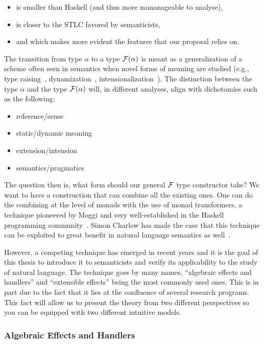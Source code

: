 \begin{itemize}
\item is smaller than Haskell (and thus more mananageable to analyse),
\item is closer to the STLC favored by semanticists,
\item and which makes more evident the features that our proposal relies on.
\end{itemize}

The transition from type $\alpha$ to a type $\mathcal{F}(\alpha)$ is meant as a
generalization of a scheme often seen in semantics when novel forms of
meaning are studied (e.g., type raising~\cite{montague1973proper},
dynamization~\cite{lebedeva2012expression},
intensionalization~\cite{de2013note}). The distinction between the type
$\alpha$ and the type $\mathcal{F}(\alpha)$ will, in different analyses, align with
dichotomies such as the following:

\begin{itemize}
\item reference/sense
\item static/dynamic meaning
\item extension/intension
\item semantics/pragmatics
\end{itemize}

The question then is, what form should our general $\mathcal{F}$ type constructor
take? We want to have a construction that can combine all the existing
ones. One can do the combining at the level of monads with the use of monad
transformers, a technique pioneered by Moggi and very well-established in
the Haskell programming community~\cite{moggi1991notions}. Simon Charlow
has made the case that this technique can be exploited to great benefit in
natural language semantics as well~\cite{charlow2014semantics}.

However, a competing technique has emerged in recent years and it is the
goal of this thesis to introduce it to semanticists and verify its
applicability to the study of natural language. The technique goes by many
names, ``algebraic effects and handlers'' and ``extensible effects'' being
the most commonly used ones. This is in part due to the fact that it lies
at the confluence of several research programs. This fact will allow us to
present the theory from two different perspectives so you can be equipped
with two different intuitive models.


\subsubsection*{Algebraic Effects and Handlers}

